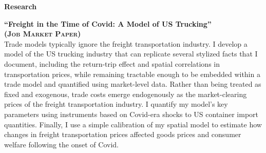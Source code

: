 \documentclass[10pt, oneside]{article}
\makeatletter
\newlength\tdima
\newcommand\tabfill[1]{%
      \setlength\tdima{\linewidth}%
      \addtolength\tdima{\@totalleftmargin}%
      \addtolength\tdima{-\dimen\@curtab}%
      \parbox[t]{\tdima}{#1\ifhmode\strut\fi}}
\newcommand\mytabs{\hspace*{1cm}\=\hspace{1cm}\=\hspace{1cm}\=\hspace{1cm}\=\hspace{1cm}\=\hspace{1cm}\=\hspace{1cm}\=\hspace{1cm}\=\hspace{1cm}\=\hspace{1cm}}
\newenvironment{mysec}[1][\mytabs]
  {\begin{tabbing}#1\kill\ignorespaces}
  {\end{tabbing}}
\makeatother
\begin{document}


\begin{minipage}[t]{0.1\linewidth}
\textbf{Research}
\end{minipage}\hspace{0.05\linewidth}
\begin{minipage}[t]{0.8\linewidth}
\textbf{``Freight in the Time of Covid: A Model of US Trucking''\\ 
(\textsc{Job Market Paper})}\\ 

Trade models typically ignore the freight transportation industry. I develop a model of the US trucking industry that can replicate several stylized facts that I document, including the return-trip effect and spatial correlations in transportation prices, while remaining tractable enough to be embedded within a trade model and quantified using market-level data. Rather than being treated as fixed and exogenous, trade costs emerge endogenously as the market-clearing prices of the freight transportation industry. I quantify my model's key parameters using instruments based on Covid-era shocks to US container import quantities. Finally, I use a simple calibration of my spatial model to estimate how changes in freight transportation prices affected goods prices and consumer welfare following the onset of Covid.

\end{minipage}\vspace{5mm}
\end{document}
